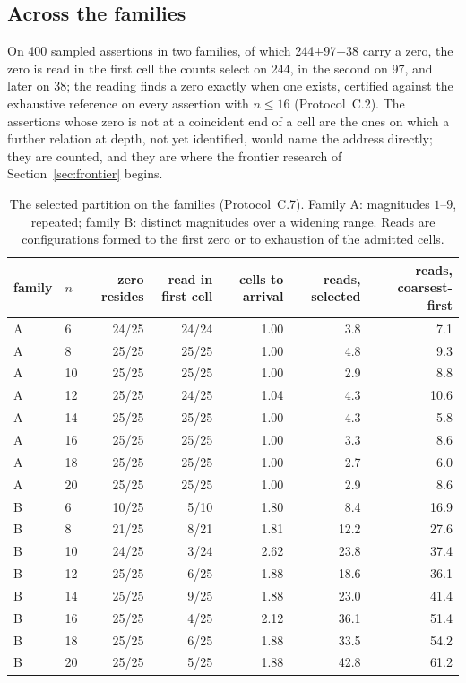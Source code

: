 \documentclass[pdflatex,sn-mathphys-num]{sn-jnl}
\theoremstyle{thmstyleone}%
\theoremstyle{thmstyletwo}%
\theoremstyle{thmstylethree}%
\newcommand{\selFirst}{244}\newcommand{\selSecond}{97}\newcommand{\selLater}{38}\newcommand{\selNone}{21}\newcommand{\selTotal}{400}
\begin{document}
\subsection{Across the families}
On \selTotal{} sampled assertions in two families, of which \selFirst{}$+$\selSecond{}$+$\selLater{} carry a zero, the zero is read in the first cell the counts select on \selFirst{}, in the second on \selSecond{}, and later on \selLater{}; the reading finds a zero exactly when one exists, certified against the exhaustive reference on every assertion with $n\le16$ (Protocol~C.2). The assertions whose zero is not at a coincident end of a cell are the ones on which a further relation at depth, not yet identified, would name the address directly; they are counted, and they are where the frontier research of Section~\ref{sec:frontier} begins.

\begin{table}[!htbp]
\centering
\caption{The selected partition on the families (Protocol~C.7). Family A: magnitudes $1$--$9$, repeated; family B: distinct magnitudes over a widening range. Reads are configurations formed to the first zero or to exhaustion of the admitted cells.}
\label{tab:selection}
\small
\begin{tabular}{llrrrrr}
\toprule
family & $n$ & zero resides & read in first cell & cells to arrival & reads, selected & reads, coarsest-first \\
\midrule
A & 6 & 24/25 & 24/24 & 1.00 & 3.8 & 7.1 \\
A & 8 & 25/25 & 25/25 & 1.00 & 4.8 & 9.3 \\
A & 10 & 25/25 & 25/25 & 1.00 & 2.9 & 8.8 \\
A & 12 & 25/25 & 24/25 & 1.04 & 4.3 & 10.6 \\
A & 14 & 25/25 & 25/25 & 1.00 & 4.3 & 5.8 \\
A & 16 & 25/25 & 25/25 & 1.00 & 3.3 & 8.6 \\
A & 18 & 25/25 & 25/25 & 1.00 & 2.7 & 6.0 \\
A & 20 & 25/25 & 25/25 & 1.00 & 2.9 & 8.6 \\
B & 6 & 10/25 & 5/10 & 1.80 & 8.4 & 16.9 \\
B & 8 & 21/25 & 8/21 & 1.81 & 12.2 & 27.6 \\
B & 10 & 24/25 & 3/24 & 2.62 & 23.8 & 37.4 \\
B & 12 & 25/25 & 6/25 & 1.88 & 18.6 & 36.1 \\
B & 14 & 25/25 & 9/25 & 1.88 & 23.0 & 41.4 \\
B & 16 & 25/25 & 4/25 & 2.12 & 36.1 & 51.4 \\
B & 18 & 25/25 & 6/25 & 1.88 & 33.5 & 54.2 \\
B & 20 & 25/25 & 5/25 & 1.88 & 42.8 & 61.2 \\
\bottomrule
\end{tabular}
\end{table}
\end{document}
